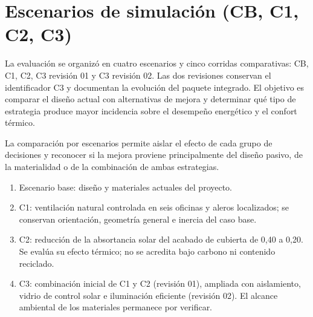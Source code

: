 \par\medskip

\section{Escenarios de simulación (CB, C1, C2, C3)}

\begin{textoDosTercios}
La evaluación se organizó en cuatro escenarios y cinco corridas comparativas: CB, C1, C2, C3 revisión 01 y C3 revisión 02. Las dos revisiones conservan el identificador C3 y documentan la evolución del paquete integrado. El objetivo es comparar el diseño actual con alternativas de mejora y determinar qué tipo de estrategia produce mayor incidencia sobre el desempeño energético y el confort térmico.

La comparación por escenarios permite aislar el efecto de cada grupo de decisiones y reconocer si la mejora proviene principalmente del diseño pasivo, de la materialidad o de la combinación de ambas estrategias.
\end{textoDosTercios}

\begin{textoDosTercios}
\begin{enumerate}
  \item Escenario base: diseño y materiales actuales del proyecto.
  \item C1: ventilación natural controlada en seis oficinas y aleros localizados; se conservan orientación, geometría general e inercia del caso base.
  \item C2: reducción de la absortancia solar del acabado de cubierta de 0,40 a 0,20. Se evalúa su efecto térmico; no se acredita bajo carbono ni contenido reciclado.
  \item C3: combinación inicial de C1 y C2 (revisión 01), ampliada con aislamiento, vidrio de control solar e iluminación eficiente (revisión 02). El alcance ambiental de los materiales permanece por verificar.
\end{enumerate}
\end{textoDosTercios}

